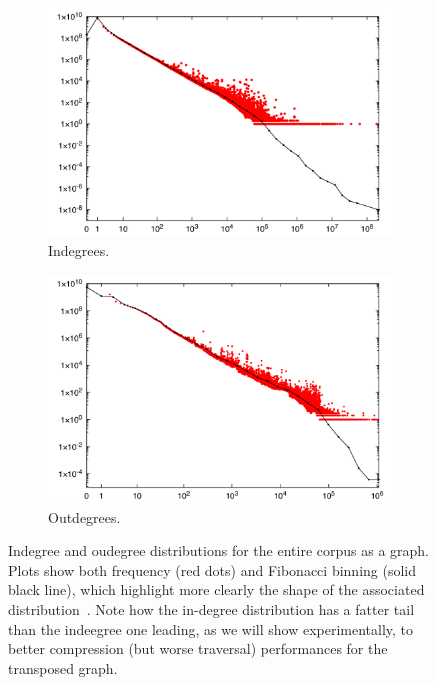 \begin{figure}
    \centering
    \begin{subfigure}[b]{.49\textwidth}
        \centering
        \includegraphics[width=\linewidth]{img/compression/indegree.png}
        \caption{Indegrees.}%
        \label{fig:compression-indegree}
    \end{subfigure}\hfill
    \begin{subfigure}[b]{.49\textwidth}
        \centering
        \includegraphics[width=\linewidth]{img/compression/outdegree.png}
        \caption{Outdegrees.}%
        \label{fig:compression-outdegree}
    \end{subfigure}
    \caption{Indegree and oudegree distributions for the entire corpus as a
    graph. Plots show both frequency (red dots) and Fibonacci binning (solid
    black line), which highlight more clearly the shape of the associated
    distribution~\cite{VigFB}. Note how the in-degree distribution has a fatter
    tail than the indeegree one leading, as we will show experimentally, to
    better compression (but worse traversal) performances for the transposed
    graph.}%
    \label{fig:compression-inoutdegree}
\end{figure}

